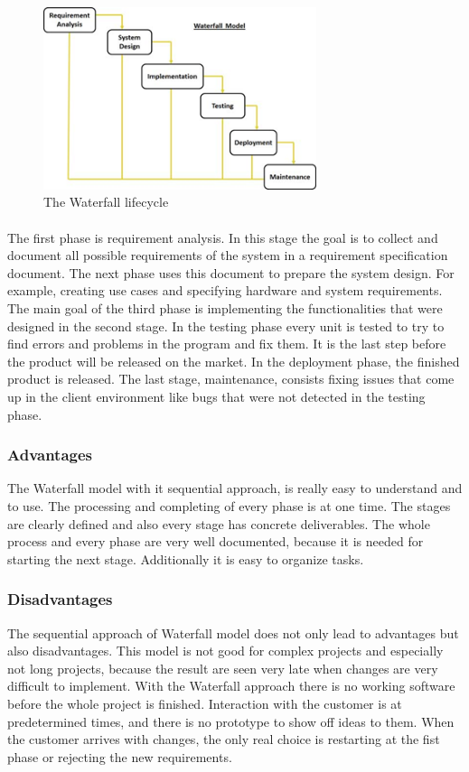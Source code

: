 \begin{figure}[ht!]
  \centering
  \includegraphics[width=80mm]{./PreliminaryStudies/img/waterfall}
  \caption{The Waterfall lifecycle}
  \label{fig:PrelimMethodWaterfall}
\end{figure}

\paragraph{}The first phase is requirement analysis. In this stage the goal is to collect and document all possible requirements of the system in a requirement specification document. The next phase uses this document to prepare the system design. For example, creating use cases and specifying hardware and system requirements. The main goal of the third phase is implementing the functionalities that were designed in the second stage. In the testing phase every unit is tested to try to find errors and problems in the program and fix them. It is the last step before the product will be released on the market. In the deployment phase, the finished product is released. The last stage, maintenance, consists fixing issues that come up in the client environment like bugs that were not detected in the testing phase.

\subsubsection{Advantages}
The Waterfall model with it sequential approach, is really easy to understand and to use. The processing and completing of every phase is at one time. The stages are clearly defined and also every stage has concrete deliverables. The whole process and every phase are very well documented, because it is needed for starting the next stage. Additionally it is easy to organize tasks.

\subsubsection{Disadvantages}
The sequential approach of Waterfall model does not only lead to advantages but also disadvantages. This model is not good for complex projects and especially not long projects, because the result are seen very late when changes are very difficult to implement. With the Waterfall approach there is no working software before the whole project is finished.  Interaction with the customer is at predetermined times, and there is no prototype to show off ideas to them. When the customer arrives with changes, the only real choice is restarting at the fist phase or rejecting the new requirements.


